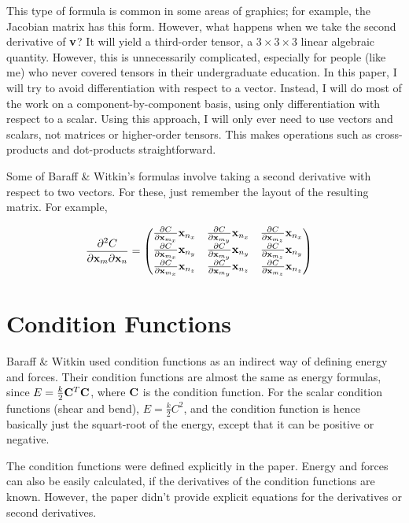 \documentclass[twocolumn]{article}
\newcommand{\pfrac}[2]{
    \frac{\partial #1}{\partial #2}
}
\newcommand{\pfractwo}[3]{
    \frac{\partial^2 #1}{\partial #2 \partial #3}
}
\newcommand{\x}{{\bf x}}
\newcommand{\xm}{\x_m}
\newcommand{\xmx}{\x_{m_x}}
\newcommand{\xmy}{\x_{m_y}}
\newcommand{\xmz}{\x_{m_z}}
\newcommand{\xn}{\x_n}
\newcommand{\xnx}{\x_{n_x}}
\newcommand{\xny}{\x_{n_y}}
\newcommand{\xnz}{\x_{n_z}}
\begin{document}
This type of formula is common in some areas of graphics; for example, the
Jacobian matrix has this form. However, what happens when we take the second
derivative of ${\bf v}$? It will yield a third-order tensor, a
$3\times3\times3$ linear algebraic quantity. However, this is unnecessarily
complicated, especially for people (like me) who never covered tensors in
their undergraduate education. In this paper, I will try to avoid
differentiation with respect to a vector. Instead, I will do most of the work
on a component-by-component basis, using only differentiation with respect to
a scalar. Using this approach, I will only ever need to use vectors and
scalars, not matrices or higher-order tensors. This makes operations such as
cross-products and dot-products straightforward.

Some of Baraff \& Witkin's formulas involve taking a second derivative with
respect to two vectors. For these, just remember the layout of the resulting
matrix. For example,

\begin{align*}
    \pfractwo{C}{\xm}{\xn} &= \begin{pmatrix}
        \pfrac{C}{\xmx}{\xnx} & \pfrac{C}{\xmy}{\xnx} & \pfrac{C}{\xmz}{\xnx} \\
        \pfrac{C}{\xmx}{\xny} & \pfrac{C}{\xmy}{\xny} & \pfrac{C}{\xmz}{\xny} \\
        \pfrac{C}{\xmx}{\xnz} & \pfrac{C}{\xmy}{\xnz} & \pfrac{C}{\xmz}{\xnz}
    \end{pmatrix}
\end{align*}

\section{Condition Functions}

Baraff \& Witkin used condition functions as an indirect way of defining
energy and forces. Their condition functions are almost the same as energy
formulas, since $E=\frac{k}{2}{\bf C}^T{\bf C}$, where ${\bf C}$ is the
condition function. For the scalar condition functions (shear and bend),
$E=\frac{k}{2}C^2$, and the condition function is hence basically just the
squart-root of the energy, except that it can be positive or negative.

The condition functions were defined explicitly in the paper. Energy
and forces can also be easily calculated, if the derivatives of the condition
functions are known. However, the paper didn't provide explicit equations for
the derivatives or second derivatives.
\end{document}
